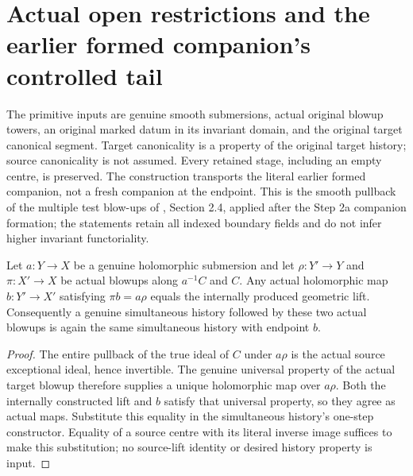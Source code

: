 \section{Actual open restrictions and the earlier formed companion's controlled tail}
The primitive inputs are genuine smooth submersions, actual original blowup towers, an original marked datum in its invariant domain, and the original target canonical segment. Target canonicality is a property of the original target history; source canonicality is not assumed. Every retained stage, including an empty centre, is preserved. The construction transports the literal earlier formed companion, not a fresh companion at the endpoint. This is the smooth pullback of the multiple test blow-ups of \cite{wlodarczyk05-hironaka}, Section 2.4, applied after the Step 2a companion formation; the statements retain all indexed boundary fields and do not infer higher invariant functoriality.

\begin{lemma}
\label{hir:historical-control-lift}
\leanok
Let $a:Y\to X$ be a genuine holomorphic submersion and let $\rho:Y'\to Y$ and $\pi:X'\to X$ be actual blowups along $a^{-1}C$ and $C$. Any actual holomorphic map $b:Y'\to X'$ satisfying $\pi b=a\rho$ equals the internally produced geometric lift. Consequently a genuine simultaneous history followed by these two actual blowups is again the same simultaneous history with endpoint $b$.
\end{lemma}
\begin{proof}
The entire pullback of the true ideal of $C$ under $a\rho$ is the actual source exceptional ideal, hence invertible. The genuine universal property of the actual target blowup therefore supplies a unique holomorphic map over $a\rho$. Both the internally constructed lift and $b$ satisfy that universal property, so they agree as actual maps. Substitute this equality in the simultaneous history's one-step constructor. Equality of a source centre with its literal inverse image suffices to make this substitution; no source-lift identity or desired history property is input.
\end{proof}

